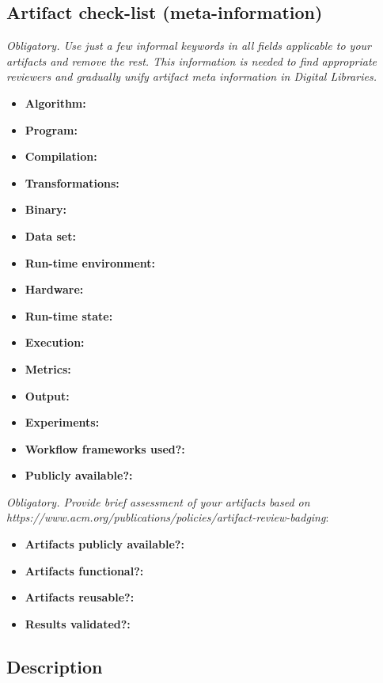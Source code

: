 \documentclass{sigplanconf}
\begin{document}
\subsection{Artifact check-list (meta-information)}

{\em Obligatory. Use just a few informal keywords in all fields applicable to your artifacts
and remove the rest. This information is needed to find appropriate reviewers and gradually 
unify artifact meta information in Digital Libraries.}

{\small
\begin{itemize}
  \item {\bf Algorithm: }
  \item {\bf Program: }
  \item {\bf Compilation: }
  \item {\bf Transformations: }
  \item {\bf Binary: }
  \item {\bf Data set: }
  \item {\bf Run-time environment: }
  \item {\bf Hardware: }
  \item {\bf Run-time state: }
  \item {\bf Execution: }
  \item {\bf Metrics: }
  \item {\bf Output: }
  \item {\bf Experiments: }
  \item {\bf Workflow frameworks used?: }
  \item {\bf Publicly available?: }
\end{itemize}

{\em Obligatory. Provide brief assessment of your artifacts 
based on {\em https://www.acm.org/publications/policies/artifact-review-badging}}:

\begin{itemize}
  \item {\bf Artifacts publicly available?: }
  \item {\bf Artifacts functional?:}
  \item {\bf Artifacts reusable?:}
  \item {\bf Results validated?:}
\end{itemize}

\subsection{Description}

}
\end{document}
